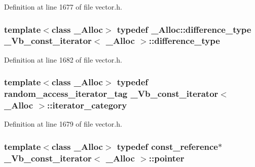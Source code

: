 Definition at line 1677 of file vector.\+h.

\hypertarget{class___vb__const__iterator_a5966ee8cd6e57759253addfa4821de91}{
\subsubsection[{difference\+\_\+type}]{\setlength{\rightskip}{0pt plus 5cm}template$<$class \+\_\+\+Alloc$>$ typedef \+\_\+\+Alloc\+::difference\+\_\+type {\bf \+\_\+\+Vb\+\_\+const\+\_\+iterator}$<$ \+\_\+\+Alloc $>$\+::{\bf difference\+\_\+type}}}\label{class___vb__const__iterator_a5966ee8cd6e57759253addfa4821de91}


Definition at line 1682 of file vector.\+h.

\hypertarget{class___vb__const__iterator_aa81c954de1d156ee1cc846296d52d38a}{
\subsubsection[{iterator\+\_\+category}]{\setlength{\rightskip}{0pt plus 5cm}template$<$class \+\_\+\+Alloc$>$ typedef random\+\_\+access\+\_\+iterator\+\_\+tag {\bf \+\_\+\+Vb\+\_\+const\+\_\+iterator}$<$ \+\_\+\+Alloc $>$\+::{\bf iterator\+\_\+category}}}\label{class___vb__const__iterator_aa81c954de1d156ee1cc846296d52d38a}


Definition at line 1679 of file vector.\+h.

\hypertarget{class___vb__const__iterator_a2da9762fd4a47847dc3901d172b86263}{
\subsubsection[{pointer}]{\setlength{\rightskip}{0pt plus 5cm}template$<$class \+\_\+\+Alloc$>$ typedef {\bf const\+\_\+reference}$\ast$ {\bf \+\_\+\+Vb\+\_\+const\+\_\+iterator}$<$ \+\_\+\+Alloc $>$\+::{\bf pointer}}}\label{class___vb__const__iterator_a2da9762fd4a47847dc3901d172b86263}



